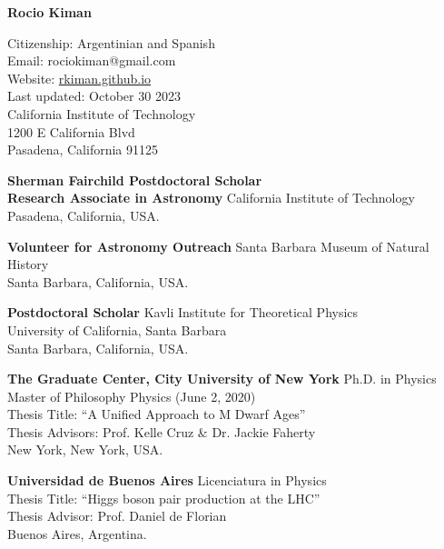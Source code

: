 \documentclass[10pt]{cv}
\newcommand{\firstpagestyle}{empty} %
\begin{document}
\thispagestyle{\firstpagestyle} 
\begin{center}
{\LARGE \textbf{\sc Rocio Kiman}}\\
\bigskip
\bigskip
\end{center}
\normalsize
  
\addresses
{
Citizenship: Argentinian and Spanish\\
Email: rociokiman@gmail.com\\
Website: \href{https://rkiman.github.io}{rkiman.github.io}\\
Last updated: October 30 2023\\
}
{
California Institute of Technology\\
1200 E California Blvd\\
Pasadena, California 91125
}

\begin{llist}


\textbf{Sherman Fairchild Postdoctoral Scholar\\Research Associate in Astronomy}
California Institute of Technology \\
Pasadena, California, USA.

\textbf{Volunteer for Astronomy Outreach}
Santa Barbara Museum of Natural History \\
Santa Barbara, California, USA.


\textbf{Postdoctoral Scholar}
Kavli Institute for Theoretical Physics \\
University of California, Santa Barbara \\
Santa Barbara, California, USA.


\textbf{The Graduate Center, City University of New York}
Ph.D. in Physics\\
Master of Philosophy Physics (June 2, 2020)\\
Thesis Title: ``A Unified Approach to M Dwarf Ages''\\
Thesis Advisors: Prof. Kelle Cruz \& Dr. Jackie Faherty \\
New York, New York, USA.

\textbf{Universidad de Buenos Aires}
Licenciatura in Physics\\
Thesis Title: ``Higgs boson pair production at the LHC''\\
Thesis Advisor: Prof. Daniel de Florian\\
Buenos Aires, Argentina.




\end{llist}
\end{document}
